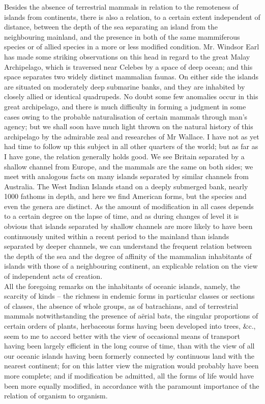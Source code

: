 \indent Besides the absence of terrestrial mammals in relation to the remoteness of islands from continents, there is also a relation, to a certain extent independent of distance, between the depth of the sea separating an island from the neighbouring mainland, and the presence in both of the same mammiferous species or of allied species in a more or less modified condition. Mr. Windsor Earl has made some striking observations on this head in regard to the great Malay Archipelago, which is traversed near Celebes by a space of deep ocean; and this space separates two widely distinct mammalian faunas.  On either side the islands are situated on moderately deep submarine banks, and they are inhabited by closely allied or identical quadrupeds. No doubt some few anomalies occur in this great archipelago, and there is much difficulty in forming a judgment in some cases owing to the probable naturalisation of certain mammals through man's agency; but we shall soon have much light thrown on the natural history of this archipelago by the admirable zeal and researches of Mr Wallace. I have not as yet had time to follow up this subject in all other quarters of the world; but as far as I have gone, the relation generally holds good. We see Britain separated by a shallow channel from Europe, and the mammals are the same on both sides; we meet with analogous facts on many islands separated by similar channels from Australia. The West Indian Islands stand on a deeply submerged bank, nearly 1000 fathoms in depth, and here we find American forms, but the species and even the genera are distinct. As the amount of modification in all cases depends to a certain degree on the lapse of time, and as during changes of level it is obvious that islands separated by shallow channels are more likely to have been continuously united within a recent period to the mainland than islands separated by deeper channels, we can understand the frequent relation between the depth of the sea and the degree of affinity of the mammalian inhabitants of islands with those of a neighbouring continent, an explicable relation on the view of independent acts of creation.~\\
\indent All the foregoing remarks on the inhabitants of oceanic islands, namely, the scarcity of kinds -- the richness in endemic forms in particular classes or sections of classes, the absence of whole groups, as of batrachians, and of terrestrial mammals notwithstanding the presence of a\"{e}rial bats, the singular proportions of certain orders of plants, herbaceous forms having been developed into trees, \&c., seem to me to accord better with the view of occasional means of transport having been largely efficient in the long course of time, than with the view of all our oceanic islands having been formerly connected by continuous land with the nearest continent; for on this latter view the migration would probably have been more complete; and if modification be admitted, all the forms of life would have been more equally modified, in accordance with the paramount importance of the relation of organism to organism.~\\
